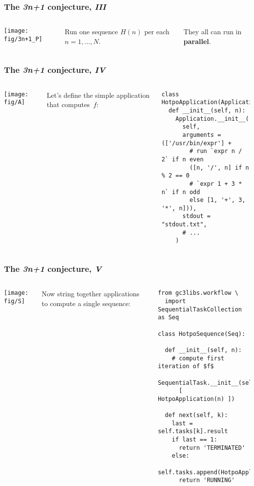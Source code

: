 \documentclass[english,serif,mathserif,xcolor=pdftex,dvipsnames,table]{beamer}
\begin{document}
\begin{frame}
  \frametitle{The \emph{3n+1} conjecture, \emph{III}}
  \label{sec:7c}

  \+
  \begin{columns}[c]
    \texttt{[image: fig/3n+1\_P]}

    Run one sequence $H(n)$ per each $n = 1, \ldots, N$.

    \+
    They all can run in \textbf{parallel}.
  \end{columns}
\end{frame}

\begin{frame}[fragile]
  \frametitle{The \emph{3n+1} conjecture, \emph{IV}}
  \label{sec:10}

  \begin{columns}
    \begin{center}
      \texttt{[image: fig/A]}
    \end{center}

    Let's define the simple application that computes~$f$:
    \begin{lstlisting}
class HotpoApplication(Application):
  def __init__(self, n):
    Application.__init__(
      self,
      arguments = (['/usr/bin/expr'] +
        # run `expr n / 2` if n even
        ([n, '/', n] if n % 2 == 0
        # `expr 1 + 3 * n` if n odd
        else [1, '+', 3, '*', n])),
      stdout = "stdout.txt",
      # ...
    )
    \end{lstlisting}
  \end{columns}
\end{frame}

\begin{frame}[fragile]
  \frametitle{The \emph{3n+1} conjecture, \emph{V}}
  \label{sec:14}

  \begin{columns}
    \begin{center}
      \texttt{[image: fig/S]}
    \end{center}

    \small
    Now string together applications to compute a
    single sequence:
    \begin{lstlisting}[basicstyle=\ttfamily\footnotesize]
from gc3libs.workflow \
  import SequentialTaskCollection as Seq

class HotpoSequence(Seq):

  def __init__(self, n):
    # compute first iteration of $f$
    SequentialTask.__init__(self,
      [ HotpoApplication(n) ])

  def next(self, k):
    last = self.tasks[k].result
    if last == 1:
      return 'TERMINATED'
    else:
      self.tasks.append(HotpoApplication(last))
      return 'RUNNING'
    \end{lstlisting}
  \end{columns}
\end{frame}
\end{document}
